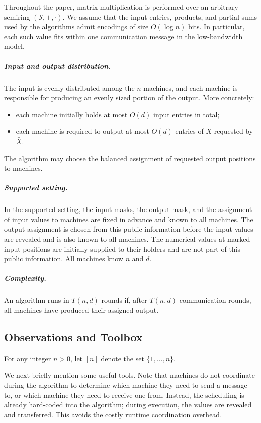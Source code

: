 Throughout the paper, matrix multiplication is performed over an arbitrary semiring $(\mathcal{S},+,\cdot)$. We assume that the input entries, products, and partial sums used by the algorithms admit encodings of size $O(\log n)$ bits.
In particular, each such value fits within one communication message in the low-bandwidth model.

\subparagraph{Input and output distribution.}
The input is evenly distributed among the $n$ machines, and each machine is responsible for producing an evenly sized portion of the output.
More concretely:
\begin{itemize}
  \item each machine initially holds at most $O(d)$ input entries in total;
  \item each machine is required to output at most $O(d)$ entries of $X$ requested by $\bar{X}$.
\end{itemize}
The algorithm may choose the balanced assignment of requested output positions to machines. 

\subparagraph{Supported setting.}
In the supported setting, the input masks, the output mask, and the assignment of input values to machines are fixed in advance and known to all machines.
The output assignment is chosen from this public information before the input values are revealed and is also known to all machines.
The numerical values at marked input positions are initially supplied to their holders and are not part of this public information.
All machines know $n$ and $d$.

\subparagraph{Complexity.}
An algorithm runs in $T(n,d)$ rounds if, after $T(n,d)$ communication
rounds, all machines have produced their assigned output.

\subsection{Observations and Toolbox}\label{subsec:toolbox}

For any integer $n>0$, let $[n]$ denote the set $\{1,\ldots,n\}$.


We next briefly mention some useful tools. Note that machines do not coordinate during the algorithm to determine which machine they need to send a message to, or which machine they need to receive one from. Instead, the scheduling is already hard-coded into the algorithm; during execution, the values are revealed and transferred. This avoids the costly runtime coordination overhead. 


